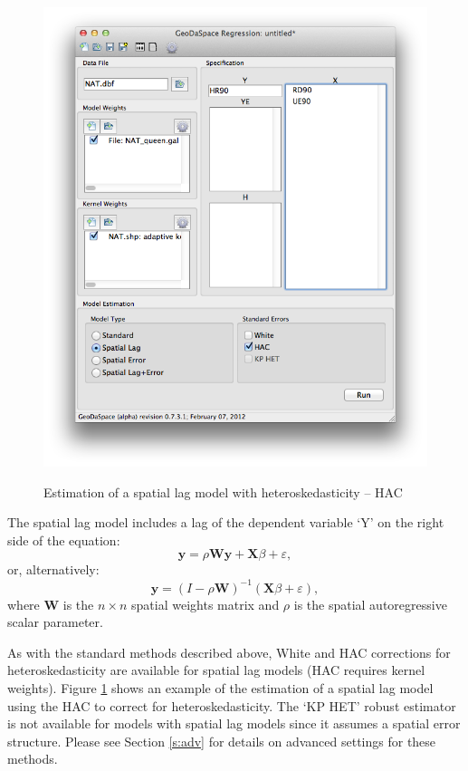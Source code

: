\documentclass{article}
\begin{document}
\begin{figure}[htb]
\begin{center}
\includegraphics[width=0.7\linewidth]{haclag.png}\\
\caption{Estimation of a spatial lag model with heteroskedasticity -- HAC}
\label{f:haclag}
\end{center}
\end{figure}

The spatial lag model includes a lag of the dependent variable `Y' on the right side of the equation:
\begin{equation}
\mathbf{y} =  \rho \mathbf{W} \mathbf{y} + \mathbf{X}\beta + \varepsilon,
\end{equation}
or, alternatively:
\begin{equation}
\mathbf{y} =  (I - \rho \mathbf{W})^{-1} (\mathbf{X}\beta + \varepsilon),
\end{equation}
where $\mathbf{W}$ is the $n \times n$ spatial weights matrix and $\rho$ is the spatial autoregressive scalar parameter.

As with the standard methods described above, White and HAC corrections for heteroskedasticity are available for spatial lag models (HAC requires kernel weights). Figure \ref{f:haclag} shows an example of the estimation of a spatial lag model using the HAC to correct for heteroskedasticity. The `KP HET' robust estimator is not available for models with spatial lag models since it assumes a spatial error structure. Please see Section \ref{s:adv} for details on advanced settings for these methods.
\FloatBarrier
\end{document}
